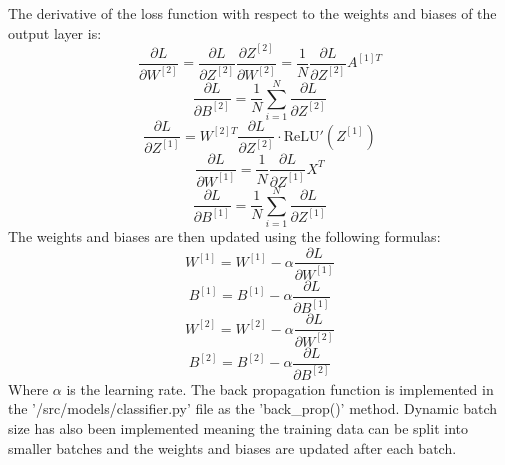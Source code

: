 \documentclass[11pt]{article}
\theoremstyle{definition}
\begin{document}
The derivative of the loss function with respect to the weights and biases of the
output layer is:
\begin{equation}
    \frac{\partial L}{\partial W^{[2]}} = \frac{\partial L}{\partial Z^{[2]}}\frac{\partial Z^{[2]}}{\partial W^{[2]}} = \frac{1}{N}\frac{\partial L}{\partial Z^{[2]}}A^{[1]T}
\end{equation}
\begin{equation}
    \frac{\partial L}{\partial B^{[2]}} = \frac{1}{N}\sum_{i=1}^{N}\frac{\partial L}{\partial Z^{[2]}}
\end{equation}
\begin{equation}
    \frac{\partial L}{\partial Z^{[1]}} = W^{[2]T}\frac{\partial L}{\partial Z^{[2]}} \cdot \text{ReLU}'(Z^{[1]})
\end{equation}
\begin{equation}
    \frac{\partial L}{\partial W^{[1]}} = \frac{1}{N}\frac{\partial L}{\partial Z^{[1]}}X^{T}
\end{equation}
\begin{equation}
    \frac{\partial L}{\partial B^{[1]}} = \frac{1}{N}\sum_{i=1}^{N}\frac{\partial L}{\partial Z^{[1]}}
\end{equation}
The weights and biases are then updated using the following formulas:
\begin{equation}
    W^{[1]} = W^{[1]} - \alpha \frac{\partial L}{\partial W^{[1]}}
\end{equation}
\begin{equation}
    B^{[1]} = B^{[1]} - \alpha \frac{\partial L}{\partial B^{[1]}}
\end{equation}
\begin{equation}
    W^{[2]} = W^{[2]} - \alpha \frac{\partial L}{\partial W^{[2]}}
\end{equation}
\begin{equation}
    B^{[2]} = B^{[2]} - \alpha \frac{\partial L}{\partial B^{[2]}}
\end{equation}
Where $\alpha$ is the learning rate. The back propagation function is implemented in
the '/src/models/classifier.py' file as the 'back\_prop()' method. Dynamic batch size
has also been implemented meaning the training data can be split into smaller batches
and the weights and biases are updated after each batch. 
\end{document}
